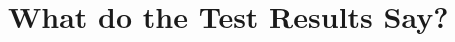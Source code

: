 \section{What do the Test Results Say?}\label{sec:what_do_the_test_results_say}
\begin{sectionmeta}
\end{sectionmeta}
